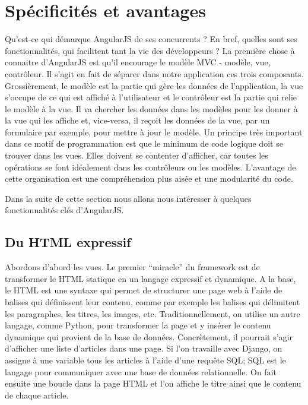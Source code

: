 \documentclass[a4paper,10pt,twoside]{sphinxmanual}
\begin{document}
\section{Spécificités et avantages}
\label{angularjs:specificites-et-avantages}
Qu'est-ce qui démarque AngularJS de ses concurrents ? En bref, quelles sont ses fonctionnalités, qui facilitent tant la vie des développeurs ? La première chose à connaitre d'AngularJS est qu'il encourage le modèle MVC - modèle, vue, contrôleur. Il s'agit en fait de séparer dans notre application ces trois composants. Grossièrement, le modèle est la partie qui gère les données de l'application, la vue s'occupe de ce qui est affiché à l'utilisateur et le contrôleur est la partie qui relie le modèle à la vue. Il va chercher les données dans les modèles pour les donner à la vue qui les affiche et, vice-versa, il reçoit les données de la vue, par un formulaire par exemple, pour mettre à jour le modèle. Un principe très important dans ce motif de programmation est que le minimum de code logique doit se trouver dans les vues. Elles doivent se contenter d'afficher, car toutes les opérations se font idéalement dans les contrôleurs ou les modèles. L'avantage de cette organisation est une compréhension plus aisée et une modularité du code.

Dans la suite de cette section nous allons nous intéresser à quelques fonctionnalités clés d'AngularJS.


\subsection{Du HTML expressif}
\label{angularjs:du-html-expressif}
Abordons d'abord les vues. Le premier ``miracle'' du framework est de transformer le HTML statique en un langage expressif et dynamique. A la base, le HTML est une syntaxe qui permet de structurer une page web à l'aide de balises qui définissent leur contenu, comme par exemple les balises qui délimitent les paragraphes, les titres, les images, etc. Traditionnellement, on utilise un autre langage, comme Python, pour transformer la page et y insérer le contenu dynamique qui provient de la base de données. Concrètement, il pourrait s'agir d'afficher une liste d'articles dans une page. Si l'on travaille avec Django, on assigne à une variable  tous les articles à l'aide d'une requête SQL; SQL est le langage pour communiquer avec une base de données relationnelle. On fait ensuite une boucle dans la page HTML et l'on affiche le titre ainsi que le contenu de chaque article.
\end{document}
